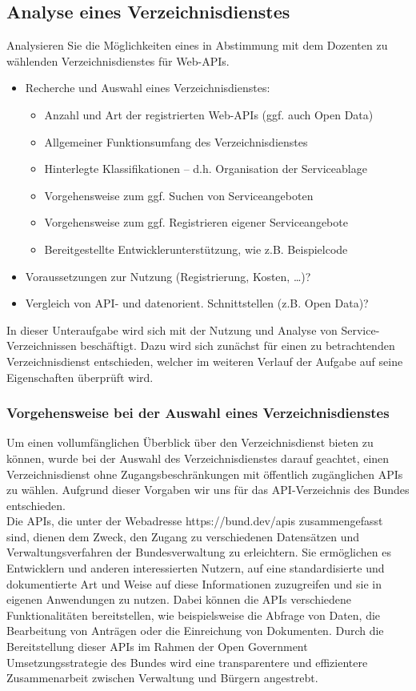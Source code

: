 \documentclass[notitlepage, hidelinks]{article}
\begin{document}
\subsection{Analyse eines Verzeichnisdienstes}
Analysieren Sie die Möglichkeiten eines in Abstimmung mit dem Dozenten zu wählenden Verzeichnisdienstes für Web-APIs.
\begin{itemize}
\item Recherche und Auswahl eines Verzeichnisdienstes:
\begin{itemize}
\item Anzahl und Art der registrierten Web-APIs (ggf. auch Open Data)
\item Allgemeiner Funktionsumfang des Verzeichnisdienstes
\item Hinterlegte Klassifikationen – d.h. Organisation der Serviceablage
\item Vorgehensweise zum ggf. Suchen von Serviceangeboten
\item Vorgehensweise zum ggf. Registrieren eigener Serviceangebote
\item Bereitgestellte Entwicklerunterstützung, wie z.B. Beispielcode
\end{itemize}
\item Voraussetzungen zur Nutzung (Registrierung, Kosten, …)?
\item Vergleich von API- und datenorient. Schnittstellen (z.B. Open Data)?
\end{itemize}

In dieser Unteraufgabe wird sich mit der Nutzung und Analyse von Service-Verzeichnissen beschäftigt. Dazu wird sich zunächst für einen zu betrachtenden Verzeichnisdienst entschieden, welcher im weiteren Verlauf der Aufgabe auf seine Eigenschaften überprüft wird.

\subsubsection{Vorgehensweise bei der Auswahl eines Verzeichnisdienstes}
Um einen vollumfänglichen Überblick über den Verzeichnisdienst bieten zu können, wurde bei der Auswahl des Verzeichnisdienstes darauf geachtet, einen Verzeichnisdienst ohne Zugangsbeschränkungen mit öffentlich zugänglichen APIs zu wählen. Aufgrund dieser Vorgaben wir uns für das API-Verzeichnis des Bundes entschieden. \\
Die APIs, die unter der Webadresse https://bund.dev/apis zusammengefasst sind, dienen dem Zweck, den Zugang zu verschiedenen Datensätzen und Verwaltungsverfahren der Bundesverwaltung zu erleichtern. Sie ermöglichen es Entwicklern und anderen interessierten Nutzern, auf eine standardisierte und dokumentierte Art und Weise auf diese Informationen zuzugreifen und sie in eigenen Anwendungen zu nutzen. Dabei können die APIs verschiedene Funktionalitäten bereitstellen, wie beispielsweise die Abfrage von Daten, die Bearbeitung von Anträgen oder die Einreichung von Dokumenten. Durch die Bereitstellung dieser APIs im Rahmen der Open Government Umsetzungsstrategie des Bundes wird eine transparentere und effizientere Zusammenarbeit zwischen Verwaltung und Bürgern angestrebt.
\end{document}

